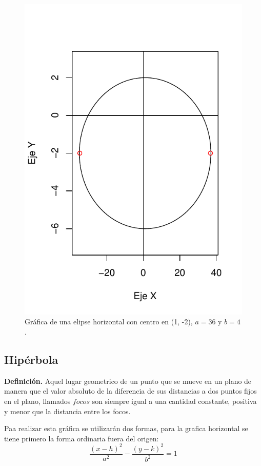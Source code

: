 \documentclass[12pt,a4paper]{report}
\begin{document}
\begin{figure}
\centering
\includegraphics[scale=0.9]{Elipse2}
\caption{Gráfica de una elipse horizontal con centro en (1, -2), $a = 36$ y $b = 4$.}
\label{fig:Elipse2}
\end{figure}

\newpage
\subsection{Hipérbola}

\textbf{Definición.} Aquel lugar geometrico de un punto que se mueve en un plano de manera que el valor absoluto de la diferencia de sus distancias a dos puntos fijos en el plano, llamados $focos$ son siempre igual a una cantidad constante, positiva y menor que la distancia entre los focos.


Paa realizar esta gráfica se utilizarán  dos formas, para la grafica horizontal se tiene  primero la forma ordinaria fuera del origen: 
\begin{equation}
\frac{(x-h)^2}{a^2}-  \frac{(y-k)^2}{b^2}= 1 \label{eq:hiperbola}
\end{equation}
\end{document}
